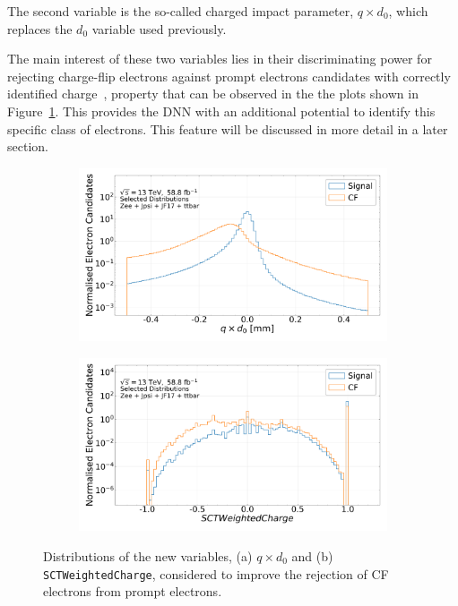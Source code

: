 The second variable is the so-called charged impact parameter, $q \times d_{0}$, which replaces the $d_{0}$ variable used previously.

The main interest of these two variables lies in their discriminating power for rejecting charge-flip electrons against prompt electrons candidates with correctly identified charge~\cite{carnelli}, property that can be observed in the the plots shown in Figure~\ref{fig:cf_plots}. This provides the DNN with an additional potential to identify this specific class of electrons. This feature will be discussed in more detail in a later section.

\begin{figure}[htbp]
  \centering
  \begin{subfigure}[b]{0.49\textwidth}
      \includegraphics[width=\textwidth]{images/selection_MultiClass_qd0_train.pdf}
      \caption{}
  \end{subfigure}
  \begin{subfigure}[b]{0.49\textwidth}
      \includegraphics[width=\textwidth]{images/selection_MultiClass_sctweightedcharge_train.pdf}
      \caption{}
  \end{subfigure}
  \caption{Distributions of the new variables, (a) $q \times d_{0}$ and (b) \texttt{SCTWeightedCharge}, considered to improve the rejection of CF electrons from prompt electrons.}
  \label{fig:cf_plots}
\end{figure}

